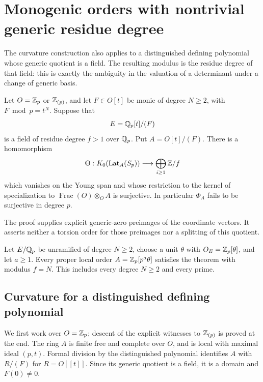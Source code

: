 \section{Monogenic orders with nontrivial generic residue degree}
\label{sec:monogenic-residue-degree}

The curvature construction also applies to a distinguished defining
polynomial whose generic quotient is a field.  The resulting modulus
is the residue degree of that field: this is exactly the ambiguity in
the valuation of a determinant under a change of generic basis.

\begin{theorem}\label{thm:monogenic-residue-degree}
Let $O=\mathbb Z_p$ or $\mathbb Z_{(p)}$, and let $F\in O[t]$ be monic of degree
$N\ge2$, with
$F\bmod p=t^N$.  Suppose that
\[
 E=\mathbb Q_p[t]/(F)
\]
is a field of residue degree $f>1$ over $\mathbb Q_p$.  Put
$A=O[t]/(F)$.  There is a homomorphism
\[
 \Theta:K_0(\operatorname{Lat}_A(S_p))\longrightarrow
             \bigoplus_{i\ge1}\mathbb Z/f
\]
which vanishes on the Young span and whose restriction to the kernel
of specialization to $\operatorname{Frac}(O)\otimes_O A$ is
surjective.  In particular $\Phi_A$
fails to be surjective in degree $p$.

The proof supplies explicit generic-zero preimages of the coordinate
vectors.  It asserts neither a torsion order for those preimages nor
a splitting of this quotient.
\end{theorem}

\begin{corollary}\label{cor:scaled-unramified-orders}
Let $E/\mathbb Q_p$ be unramified of degree $N\ge2$, choose a unit
$\theta$ with $O_E=\mathbb Z_p[\theta]$, and let $a\ge1$.  Every proper
local order $A=\mathbb Z_p[p^a\theta]$ satisfies the theorem with modulus
$f=N$.  This includes every degree $N\ge2$ and every prime.
\end{corollary}

\subsection{Curvature for a distinguished defining polynomial}

We first work over $O=\mathbb Z_p$; descent of the explicit witnesses to
$\mathbb Z_{(p)}$ is proved at the end.  The ring $A$ is finite free and
complete over $O$, and is local with
maximal ideal $(p,t)$.  Formal division by the distinguished polynomial
identifies $A$ with $R/(F)$ for $R=O[[t]]$.  Since its generic quotient
is a field, it is a domain and $F(0)\ne0$.

